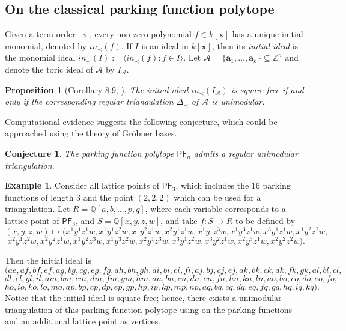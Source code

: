 \documentclass[11pt]{amsart}
\newtheorem{proposition}[theorem]{Proposition}
\newtheorem{conjecture}[theorem]{Conjecture}
\theoremstyle{definition}
\newtheorem{example}[theorem]{Example}
\newcommand{\0}{\emptyset}
\newcommand{\Q}{\mathbb{Q}}
\newcommand{\Z}{\mathbb{Z}}
\newcommand{\PF}{\mathsf{PF}}
\begin{document}
\subsection{On the classical parking function polytope}

Given a term order $\prec$, every non-zero polynomial $f \in k[\mathbf{x}]$ has a unique initial monomial, denoted by $in_\prec(f)$. 
If $I$ is an ideal in $k[\mathbf{x}]$, then its \textit{initial ideal} is the monomial ideal $in_\prec(I) := \langle in_\prec(f) : f \in I \rangle$.
Let $\mathcal{A} = \{ \mathbf{a}_1, \ldots, \mathbf{a}_k\} \subseteq \Z^n$ and denote the toric ideal of $\mathcal{A}$ by $I_\mathcal{A}$. 

\begin{proposition}[Corollary 8.9, \cite{Stu}] The initial ideal $in_\prec(I_\mathcal{A})$ is square-free if and only if the corresponding regular triangulation $\Delta_\prec$ of $\mathcal{A}$ is unimodular.
\end{proposition}

Computational evidence suggests the following conjecture, which could be approached using the theory of Gr\"obner bases.

\begin{conjecture}
The parking function polytope $\PF_n$ admits a regular unimodular triangulation. 
\end{conjecture}

\begin{example}
Consider all lattice points of $\PF_3$, which includes the $16$ parking functions of length $3$ and the point $(2,2,2)$ which can be used for a triangulation.
Let $R = \Q[a,b, \ldots,p,q]$, where each variable corresponds to a lattice point of $\PF_3$, and $S = \Q[x,y,z,w]$, and take $f: S \to R$ to be defined by
\[(x,y,z,w) \mapsto (x^1 y^1 z^1 w, x^1 y^1 z^2 w, x^1 y^2 z^1 w, x^2 y^1 z^1 w, x^1 y^1 z^3 w, x^1 y^3 z^1 w, x^3 y^1 z^1 w, x^1 y^2 z^2 w, \]
\[x^2 y^1 z^2 w, x^2 y^2 z^1 w,x^1 y^2 z^3 w, x^1 y^3 z^2 w, x^2 y^1 z^3 w, x^3 y^1 z^2 w, x^3 y^2 z^1 w, x^2 y^3 z^1 w,  x^2 y^2 z^2 w). \]

Then the initial ideal is 
\[(ae, af, bf, ef, ag, bg, cg, eg, fg, ah, bh, gh, ai, bi, ci, fi, aj, bj, cj, ej, ak, bk, ck, dk, fk, gk, al, bl,  cl, \]
\[ dl, el, gl, il, am, bm, cm, dm, fm, gm, hm, an, bn, cn, dn, en, fn, hn, kn, ln, ao, bo, co, do, eo, fo,  \]
\[ho, io, ko, lo, mo, ap, bp, cp, dp, ep, gp, hp, ip, kp, mp, np, aq, bq, cq, dq, eq, fq, gq, hq, iq, kq).\]
Notice that the initial ideal is square-free; hence, there exists a unimodular triangulation of this parking function polytope using on the parking functions and an additional lattice point as vertices.
\end{example} 
\end{document}

